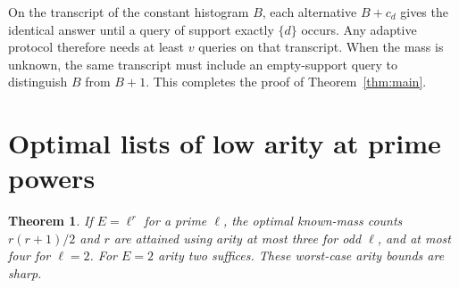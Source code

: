 \documentclass[11pt]{article}
\newtheorem{theorem}{Theorem}
\begin{document}
On the transcript of the constant histogram $B$, each alternative $B+c_d$ gives the identical answer until a query of support exactly $\{d\}$ occurs. Any adaptive protocol therefore needs at least $v$ queries on that transcript. When the mass is unknown, the same transcript must include an empty-support query to distinguish $B$ from $B+1$. This completes the proof of Theorem~\ref{thm:main}.

\section{Optimal lists of low arity at prime powers}
\begin{theorem}\label{thm:power}
If $E=\ell^r$ for a prime $\ell$, the optimal known-mass counts $r(r+1)/2$ and $r$ are attained using arity at most three for odd $\ell$, and at most four for $\ell=2$. For $E=2$ arity two suffices. These worst-case arity bounds are sharp.
\end{theorem}
\end{document}
